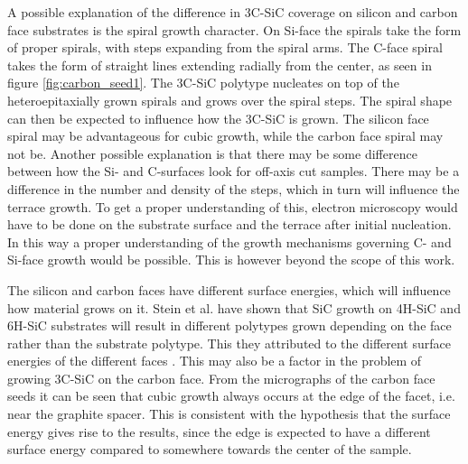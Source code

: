 A possible explanation of the difference in 3C-SiC coverage on silicon and carbon face substrates is the spiral growth character. On Si-face the spirals take the form of proper spirals, with steps expanding from the spiral arms. The C-face spiral takes the form of straight lines extending radially from the center, as seen in figure \ref{fig:carbon_seed1}. The 3C-SiC polytype nucleates on top of the heteroepitaxially grown spirals and grows over the spiral steps. The spiral shape can then be expected to influence how the 3C-SiC is grown. The silicon face spiral may be advantageous for cubic growth, while the carbon face spiral may not be. Another possible explanation is that there may be some difference between how the Si- and C-surfaces look for off-axis cut samples. There may be a difference in the number and density of the steps, which in turn will influence the terrace growth. To get a proper understanding of this, electron microscopy would have to be done on the substrate surface and the terrace after initial nucleation. In this way a proper understanding of the growth mechanisms governing C- and Si-face growth would be possible. This is however beyond the scope of this work. 

The silicon and carbon faces have different surface energies, which will influence how material grows on it. Stein et al. have shown that SiC growth on 4H-SiC and 6H-SiC substrates will result in different polytypes grown depending on the face rather than the substrate polytype. This they attributed to the different surface energies of the different faces \cite{Stein1992}. This may also be a factor in the problem of growing 3C-SiC on the carbon face. From the micrographs of the carbon face seeds it can be seen that cubic growth always occurs at the edge of the facet, i.e. near the graphite spacer. This is consistent with the hypothesis that the surface energy gives rise to the results, since the edge is expected to have a different surface energy compared to somewhere towards the center of the sample. 


